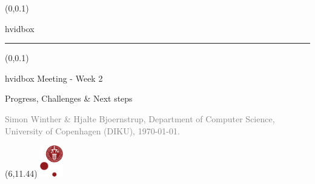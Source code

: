 \documentclass[t,24pt]{beamer}
\begin{document}
{
\begin{frame}
    \begin{textblock*}{\textwidth}(0\textwidth,0.1\textheight)
        \begin{beamercolorbox}[wd=6.3cm,ht=7.7cm,sep=0.5cm]{hvidbox}
            \fontsize{4}{10}\selectfont {}
            \noindent\textcolor{KUrod}{\rule{5.3cm}{0.4pt}}
        \end{beamercolorbox}
    \end{textblock*}
    \begin{textblock*}{\textwidth}(0\textwidth,0.1\textheight)
        \begin{beamercolorbox}[wd=6.3cm,sep=0.5cm]{hvidbox}
                \Large \textcolor{KUrod}{Meeting - Week 2}
                \vspace{0.5cm}
                \par
                \large Progress, Challenges \& Next steps
                \vspace{0.5cm}
                \par
                \textcolor{gray}{\scriptsize Simon Winther \& Hjalte Bjoernstrup, Department of Computer Science, University of Copenhagen (DIKU), \today.}
        \end{beamercolorbox}
    \end{textblock*}
    \begin{textblock}{1}(6,11.44)
        \includegraphics[width=1cm]{KU/KU-logo.png}
    \end{textblock}
\end{frame}
}
\end{document}
